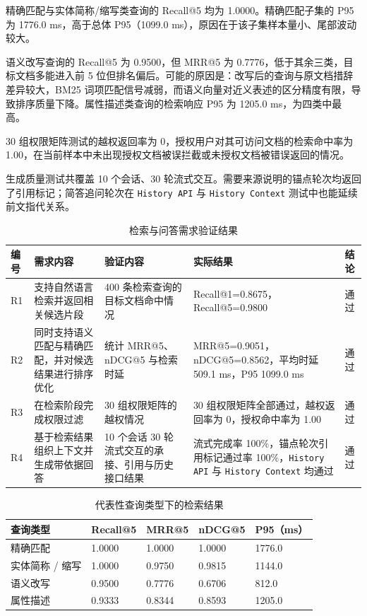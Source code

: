 精确匹配与实体简称/缩写类查询的 Recall@5 均为 1.0000。精确匹配子集的 P95 为 1776.0 ms，高于总体 P95（1099.0 ms），原因在于该子集样本量小、尾部波动较大。

语义改写查询的 Recall@5 为 0.9500，但 MRR@5 为 0.7776，低于其余三类，目标文档多能进入前 5 位但排名偏后。可能的原因是：改写后的查询与原文档措辞差异较大，BM25 词项匹配信号减弱，而语义向量对近义表述的区分精度有限，导致排序质量下降。属性描述类查询的检索响应 P95 为 1205.0 ms，为四类中最高。

30 组权限矩阵测试的越权返回率为 0，授权用户对其可访问文档的检索命中率为 1.00，在当前样本中未出现授权文档被误拦截或未授权文档被错误返回的情况。

生成质量测试共覆盖 10 个会话、30 轮流式交互。需要来源说明的锚点轮次均返回了引用标记；简答追问轮次在 \texttt{History API} 与 \texttt{History Context} 测试中也能延续前文指代关系。

\begin{table}[!htbp]
    \centering
    \caption{检索与问答需求验证结果}
    \label{tab:retrieval-qa-test}
    {\small
    \begin{tabularx}{\textwidth}{L{1.2cm}L{3.8cm}L{3.6cm}Y L{1.4cm}}
        \toprule
        编号 & 需求内容 & 验证内容 & 实际结果 & 结论 \\
        \midrule
        R1 & 支持自然语言检索并返回相关候选片段 & 400 条检索查询的目标文档命中情况 & Recall@1=0.8675，Recall@5=0.9800 & 通过 \\
        R2 & 同时支持语义匹配与精确匹配，并对候选结果进行排序优化 & 统计 MRR@5、nDCG@5 与检索时延 & MRR@5=0.9051，nDCG@5=0.8562，平均时延 509.1 ms，P95 1099.0 ms & 通过 \\
        R3 & 在检索阶段完成权限过滤 & 30 组权限矩阵的越权情况 & 30 组权限矩阵全部通过，越权返回率为 0，授权命中率为 1.00 & 通过 \\
        R4 & 基于检索结果组织上下文并生成带依据回答 & 10 个会话 30 轮流式交互的承接、引用与历史接口结果 & 流式完成率 100\%，锚点轮次引用标记通过率 100\%，\texttt{History API} 与 \texttt{History Context} 均通过 & 通过 \\
        \bottomrule
    \end{tabularx}
    }
\end{table}

\begin{table}[!htbp]
    \centering
    \caption{代表性查询类型下的检索结果}
    \label{tab:retrieval-query-type-result}
    {\small
    \begin{tabularx}{\textwidth}{L{2.6cm}L{2.0cm}L{2.0cm}L{2.0cm}Y}
        \toprule
        查询类型 & Recall@5 & MRR@5 & nDCG@5 & P95（ms） \\
        \midrule
        精确匹配 & 1.0000 & 1.0000 & 1.0000 & 1776.0 \\
        实体简称 / 缩写 & 1.0000 & 0.9750 & 0.9815 & 1144.0 \\
        语义改写 & 0.9500 & 0.7776 & 0.6706 & 812.0 \\
        属性描述 & 0.9333 & 0.8344 & 0.8593 & 1205.0 \\
        \bottomrule
    \end{tabularx}
    }
\end{table}

